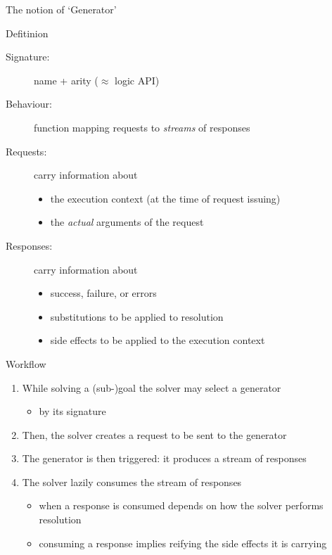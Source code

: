 \documentclass[presentation]{beamer}\mode<presentation>{\usetheme{AMSBolognaFC}}
\begin{document}
\begin{frame}[allowframebreaks]{The notion of `Generator'}
    \begin{block}{Defitinion}
        \begin{description}
            \item[Signature:] name + arity ($\approx$ logic API)
            \item[Behaviour:] function mapping \alert{requests} to \alert{\emph{streams} of responses}
            \item[Requests:] carry information about
            \begin{itemize}
                \item the execution context (at the time of request issuing)
                \item the \emph{actual} arguments of the request
            \end{itemize}
            \item[Responses:] carry information about
            \begin{itemize}
                \item success, failure, or errors
                \item substitutions to be applied to resolution
                \item side effects to be applied to the execution context
            \end{itemize}
        \end{description}
    \end{block}

    \begin{block}{Workflow}
        \begin{enumerate}\small
            \item While solving a (sub-)goal the solver may \alert{select} a generator
            \begin{itemize}\scriptsize
                \item by its \alert{signature}
            \end{itemize}

            \item Then, the solver creates a \alert{request} to be sent to the generator
            
            \item The generator is then triggered: it produces a \alert{stream of responses} 
            
            \item The solver \alert{lazily consumes} the stream of responses
            \begin{itemize}\scriptsize
                \item \alert{when} a response is consumed depends on \alert{how} the solver performs resolution
                \item consuming a response implies \alert{reifying} the side effects it is carrying
            \end{itemize}
            

\end{enumerate}
\end{block}
\end{frame}
\end{document}
